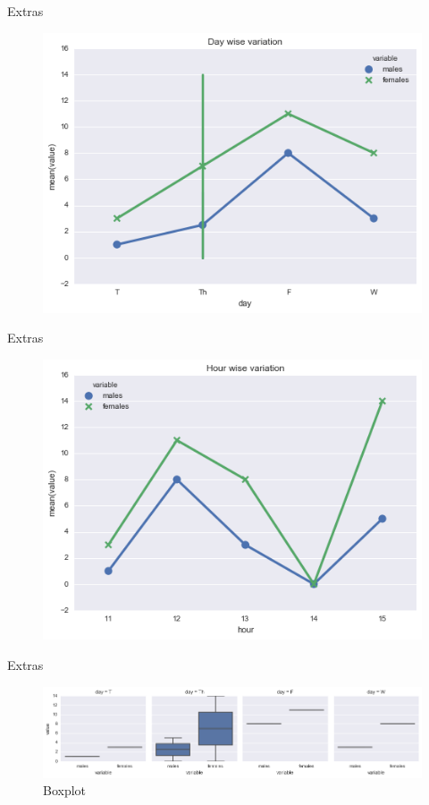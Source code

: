 \documentclass[10pt]{beamer}
\begin{document}
\begin{frame}[fragile]{Extras}
\begin{figure}
\includegraphics[width=\linewidth]{lineplot-daywise}
\end{figure}
\end{frame}


\begin{frame}[fragile]{Extras}
\begin{figure}
\includegraphics[width=\linewidth]{lineplot-hourwise}
\end{figure}
\end{frame}

\begin{frame}[fragile]{Extras}
\begin{figure}
\includegraphics[width=\linewidth]{boxplots-daywise}
\caption{Boxplot}
\end{figure}
\end{frame}
\end{document}
